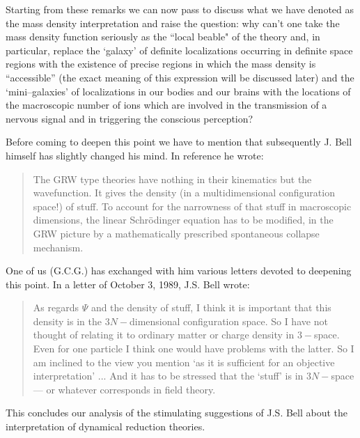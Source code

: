 \documentclass[10pt,a4paper]{article}
\begin{document}
Starting from
these remarks we can now pass to discuss what we have denoted as
the mass density interpretation and raise the question: why can't
one take the mass density function seriously as the ``local beable" of
the theory and, in particular, replace the `galaxy' of definite
localizations occurring in definite space regions with the existence of
precise regions in which the mass density is ``accessible'' (the exact
meaning of this expression will be discussed later)  and the
`mini--galaxies' of localizations in our bodies and our brains with the
locations of the macroscopic number of ions which are involved in the
transmission of a  nervous signal and in triggering the conscious
perception?

Before coming to deepen this point we have to mention that subsequently
J. Bell himself has slightly changed his mind. In reference \cite{bellam}
he wrote:
\begin{quotation}
The GRW type theories have nothing in their kinematics but the
wavefunction. It gives the density (in a multidimensional
configuration space!) of stuff. To account for the narrowness of
that stuff in macroscopic dimensions, the linear Schr\"{o}dinger
equation has to be modified, in the GRW picture by a
mathematically prescribed spontaneous collapse mechanism.
\end{quotation}
One of us (G.C.G.) has exchanged with him various letters devoted to
deepening this point. In a letter of October 3, 1989, J.S. Bell
wrote:
\begin{quotation}
As regards $\Psi $ and the density of stuff, I think it is
important that this density is in the $3N-$dimensional
configuration space. So I have not thought of relating it to
ordinary matter or charge density in $3-$space. Even for one
particle I think one would have problems with the latter. So I am
inclined to the view you mention `as it is sufficient for an
objective interpretation' ... And it has to be stressed that the
`stuff' is in $3N-$space --- or whatever corresponds in field
theory.
\end{quotation}

This concludes our analysis of the stimulating suggestions of J.S.
Bell about the interpretation of dynamical reduction theories.
\end{document}
